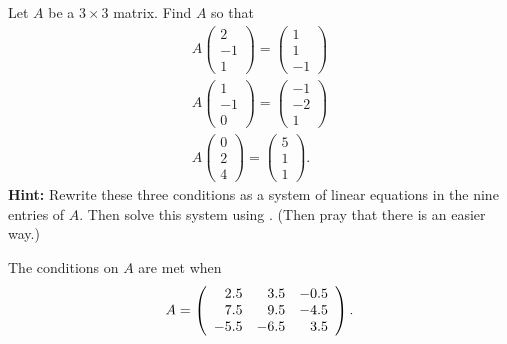 \documentclass{ximera}
\begin{document}
\begin{exercise} \label{c4.1.12}
Let $A$ be a $3\times 3$ matrix.  Find $A$ so that
\begin{eqnarray*}
A\left(\begin{array}{r} 2 \\ -1 \\ 1 \end{array}\right) =
\left(\begin{array}{r} 1 \\ 1  \\ -1 \end{array}\right) \\
A\left(\begin{array}{r} 1 \\ -1 \\ 0 \end{array}\right) =
\left(\begin{array}{r} -1 \\ -2 \\ 1 \end{array}\right)\\
A\left(\begin{array}{r} 0 \\ 2 \\ 4 \end{array}\right) =
\left(\begin{array}{r} 5 \\ 1 \\ 1 \end{array}\right).
\end{eqnarray*}
{\bf Hint:} Rewrite these three conditions as a system of linear
equations in the nine entries of $A$.  Then solve this system
using \Matlabp.  (Then pray that there is an easier way.)

\begin{solution}

\ans The conditions on $A$ are met when
\[ A = \left(\begin{array}{rrr} 2.5 & 3.5 & -0.5 \\ 7.5 & 9.5 & -4.5 \\ -5.5 & -6.5 & 3.5\end{array}\right). \]


\end{solution}
\end{exercise}
\end{document}
